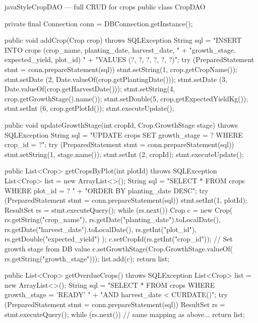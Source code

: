 \documentclass[12pt, a4paper]{report}
\begin{document}
\begin{codeblock}{javaStyle}{CropDAO --- full CRUD for crops}
public class CropDAO {
    private final Connection conn = DBConnection.getInstance();

    public void addCrop(Crop crop) throws SQLException {
        String sql = "INSERT INTO crops (crop_name, planting_date, harvest_date, "
                   + "growth_stage, expected_yield, plot_id) "
                   + "VALUES (?, ?, ?, ?, ?, ?)";
        try (PreparedStatement stmt = conn.prepareStatement(sql)) {
            stmt.setString(1, crop.getCropName());
            stmt.setDate  (2, Date.valueOf(crop.getPlantingDate()));
            stmt.setDate  (3, Date.valueOf(crop.getHarvestDate()));
            stmt.setString(4, crop.getGrowthStage().name());
            stmt.setDouble(5, crop.getExpectedYieldKg());
            stmt.setInt   (6, crop.getPlotId());
            stmt.executeUpdate();
        }
    }

    public void updateGrowthStage(int cropId, Crop.GrowthStage stage)
            throws SQLException {
        String sql = "UPDATE crops SET growth_stage = ? WHERE crop_id = ?";
        try (PreparedStatement stmt = conn.prepareStatement(sql)) {
            stmt.setString(1, stage.name());
            stmt.setInt   (2, cropId);
            stmt.executeUpdate();
        }
    }

    public List<Crop> getCropsByPlot(int plotId) throws SQLException {
        List<Crop> list = new ArrayList<>();
        String sql = "SELECT * FROM crops WHERE plot_id = ? "
                   + "ORDER BY planting_date DESC";
        try (PreparedStatement stmt = conn.prepareStatement(sql)) {
            stmt.setInt(1, plotId);
            ResultSet rs = stmt.executeQuery();
            while (rs.next()) {
                Crop c = new Crop(
                    rs.getString("crop_name"),
                    rs.getDate("planting_date").toLocalDate(),
                    rs.getDate("harvest_date").toLocalDate(),
                    rs.getInt("plot_id"),
                    rs.getDouble("expected_yield")
                );
                c.setCropId(rs.getInt("crop_id"));
                // Set growth stage from DB value
                c.setGrowthStage(Crop.GrowthStage.valueOf(
                    rs.getString("growth_stage")));
                list.add(c);
            }
        }
        return list;
    }

    public List<Crop> getOverdueCrops() throws SQLException {
        List<Crop> list = new ArrayList<>();
        String sql = "SELECT * FROM crops WHERE growth_stage = 'READY' "
                   + "AND harvest_date < CURDATE()";
        try (PreparedStatement stmt = conn.prepareStatement(sql)) {
            ResultSet rs = stmt.executeQuery();
            while (rs.next()) {
                // same mapping as above...
            }
        }
        return list;
    }
}
\end{codeblock}
\end{document}
